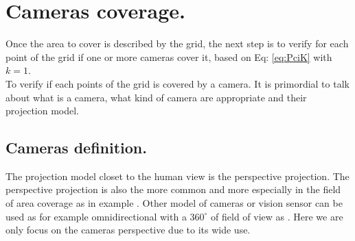 \section{ Cameras coverage.}\label{sec:CamerasCoverage}


Once the area to cover is described by the grid, the next step is to verify for each point of the grid if one or more cameras cover it, based on Eq: \ref{eq:PciK} with $k=1$.\\
To verify if each points of the grid is covered by a camera. It is primordial to talk about what is a camera, what kind of camera are appropriate and their projection model. 

\subsection{ Cameras definition.}\label{sec:CamerasDefinition}

The projection model closet to the human view is the perspective projection. The perspective projection is also the more common and more especially in the field of area coverage as in example \cite{101*topcuoglu2009,33*reddy2012,8*zhou2011,82*chrysostomou2012,22*zhao2008}. Other model of cameras or vision sensor can be used as for example omnidirectional with a $360^{\circ}$ of field of view as \citep{43*erdem2006,150*chakrabarty2002,174*zhang2016}. 
Here we are only focus on the cameras perspective due to its wide use.  \\


